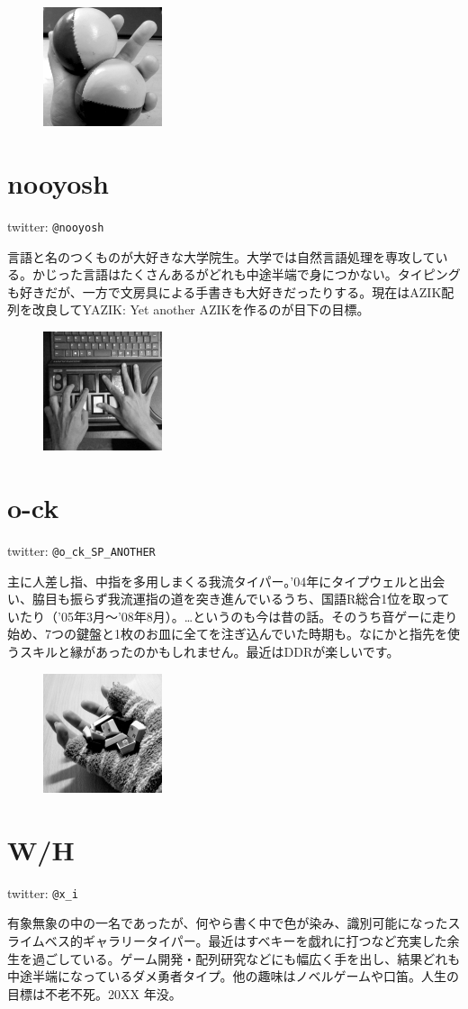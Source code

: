 \begin{figure}
\includegraphics[width=3.5cm,clip]{res_author/nooyosh_temoto.eps}
\end{figure}
\section*{nooyosh}
twitter: \verb|@nooyosh|

言語と名のつくものが大好きな大学院生。大学では自然言語処理を専攻している。かじった言語はたくさんあるがどれも中途半端で身につかない。タイピングも好きだが、一方で文房具による手書きも大好きだったりする。現在はAZIK配列を改良してYAZIK: Yet another AZIKを作るのが目下の目標。

\vspace{5mm}

\begin{figure}
\includegraphics[width=3.5cm,clip]{res_author/ock_temoto.eps}
\end{figure}
\section*{o-ck}
twitter: \verb|@o_ck_SP_ANOTHER|

主に人差し指、中指を多用しまくる我流タイパー。'04年にタイプウェルと出会い、脇目も振らず我流運指の道を突き進んでいるうち、国語R総合1位を取っていたり（'05年3月～'08年8月）。…というのも今は昔の話。そのうち音ゲーに走り始め、7つの鍵盤と1枚のお皿に全てを注ぎ込んでいた時期も。なにかと指先を使うスキルと縁があったのかもしれません。最近はDDRが楽しいです。

\vspace{5mm}

\begin{figure}
\includegraphics[width=3.5cm,clip]{res_author/x_i_temoto.eps}
\end{figure}
\section*{W/H}
twitter: \verb|@x_i|

有象無象の中の一名であったが、何やら書く中で色が染み、識別可能になったスライムベス的ギャラリータイパー。最近はすべキーを戯れに打つなど充実した余生を過ごしている。ゲーム開発・配列研究などにも幅広く手を出し、結果どれも中途半端になっているダメ勇者タイプ。他の趣味はノベルゲームや口笛。人生の目標は不老不死。20XX 年没。

